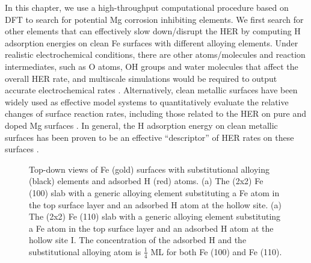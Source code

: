 In this chapter, we use a high-throughput computational procedure based on \ac{DFT} to search for potential Mg corrosion inhibiting elements. We first search for other elements that can effectively slow down/disrupt the \ac{HER} by computing H adsorption energies on clean Fe surfaces with different alloying elements. Under realistic electrochemical conditions, there are other atoms/molecules and reaction intermediates, such as O atoms, OH groups and water molecules that affect the overall \ac{HER} rate, and multiscale simulations would be required to output accurate electrochemical rates \cite{qi2012adsorbate}. Alternatively, clean metallic surfaces have been widely used as effective model systems to quantitatively evaluate the relative changes of surface reaction rates, including those related to the \ac{HER} on pure and doped Mg surfaces \cite{williams2016modeling,pozzo2009hydrogen}. In general, the H adsorption energy on clean metallic surfaces has been proven to be an effective ``descriptor'' of \ac{HER} rates on these surfaces \cite{greeley2006computational}.

\begingroup
\begin{figure}[!ht]
  \centering
  \label{Chap:Mg_H:fig:3a}
  \label{Chap:Mg_H:fig:3b}
\caption[Top-down views of Fe surfaces with substitutional alloying elements and adsorbed H atoms]{Top-down views of Fe (gold) surfaces with substitutional alloying (black) elements and adsorbed H (red) atoms. (a) The (2x2) Fe (100) slab with a generic alloying element substituting a Fe atom in the top surface layer and an adsorbed H atom at the hollow site. (a) The (2x2) Fe (110) slab with a generic alloying element substituting a Fe atom in the top surface layer and an adsorbed H atom at the hollow site I. The concentration of the adsorbed H and the substitutional alloying atom is $\frac{1}{4}$ \ac{ML} for both Fe (100) and Fe (110).}
  \label{Chap:Mg_H:fig3}
\end{figure}
\endgroup